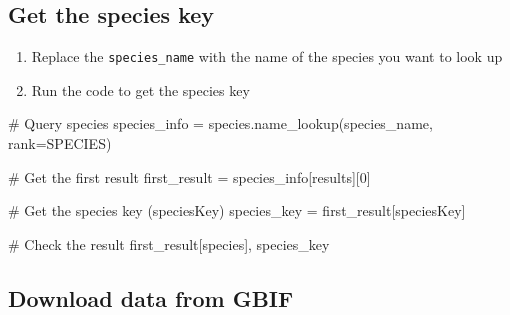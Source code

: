 \documentclass[
  letterpaper,
  DIV=11,
  numbers=noendperiod,
  oneside]{scrreprt}
\newenvironment{Shaded}{\begin{snugshade}}{\end{snugshade}}
\newcommand{\CommentTok}[1]{\textcolor[rgb]{0.37,0.37,0.37}{#1}}
\newcommand{\DecValTok}[1]{\textcolor[rgb]{0.68,0.00,0.00}{#1}}
\newcommand{\NormalTok}[1]{\textcolor[rgb]{0.00,0.23,0.31}{#1}}
\newcommand{\OperatorTok}[1]{\textcolor[rgb]{0.37,0.37,0.37}{#1}}
\newcommand{\StringTok}[1]{\textcolor[rgb]{0.13,0.47,0.30}{#1}}
\providecommand{\tightlist}{%
  \setlength{\itemsep}{0pt}\setlength{\parskip}{0pt}}
\begin{document}
\subsection{Get the species key}\label{get-the-species-key}

\begin{tcolorbox}[enhanced jigsaw, colbacktitle=quarto-callout-color!10!white, opacityback=0, bottomtitle=1mm, toptitle=1mm, bottomrule=.15mm, left=2mm, colframe=quarto-callout-color-frame, leftrule=.75mm, opacitybacktitle=0.6, colback=white, rightrule=.15mm, toprule=.15mm, breakable, titlerule=0mm, title=\textcolor{quarto-callout-color}{\faInfo}\hspace{0.5em}{Try It}, coltitle=black, arc=.35mm]

\begin{enumerate}
\def\labelenumi{\arabic{enumi}.}
\tightlist
\item
  Replace the \texttt{species\_name} with the name of the species you
  want to look up
\item
  Run the code to get the species key
\end{enumerate}

\end{tcolorbox}

\begin{Shaded}
\begin{Highlighting}[]
\CommentTok{\# Query species}
\NormalTok{species\_info }\OperatorTok{=}\NormalTok{ species.name\_lookup(species\_name, rank}\OperatorTok{=}\StringTok{\textquotesingle{}SPECIES\textquotesingle{}}\NormalTok{)}

\CommentTok{\# Get the first result}
\NormalTok{first\_result }\OperatorTok{=}\NormalTok{ species\_info[}\StringTok{\textquotesingle{}results\textquotesingle{}}\NormalTok{][}\DecValTok{0}\NormalTok{]}

\CommentTok{\# Get the species key (speciesKey)}
\NormalTok{species\_key }\OperatorTok{=}\NormalTok{ first\_result[}\StringTok{\textquotesingle{}speciesKey\textquotesingle{}}\NormalTok{]}

\CommentTok{\# Check the result}
\NormalTok{first\_result[}\StringTok{\textquotesingle{}species\textquotesingle{}}\NormalTok{], species\_key}
\end{Highlighting}
\end{Shaded}

\subsection{Download data from GBIF}\label{download-data-from-gbif}
\end{document}
